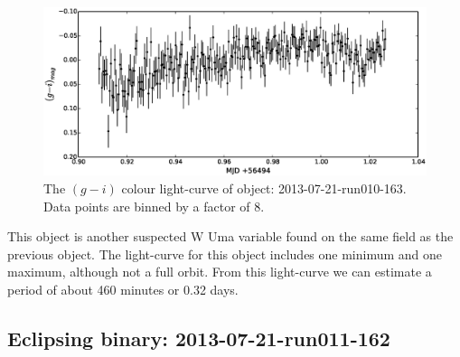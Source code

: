 \begin{figure}
  \center
  \includegraphics[width=120mm]{images/2013-07-21-run010-163_colourcurve-bin8.eps}
  \caption{The $(g - i)$ colour light-curve of object: 2013-07-21-run010-163. Data points are binned by a factor of 8.}
  \label{fig:2013-07-21-run010-163-colour}
\end{figure}



This object is another suspected {W Uma} variable found on the same field as the previous object. The light-curve for this object includes one minimum and one maximum, although not a full orbit. From this light-curve we can estimate a period of about 460 minutes or 0.32 days.

\subsection{Eclipsing binary: 2013-07-21-run011-162}
  

